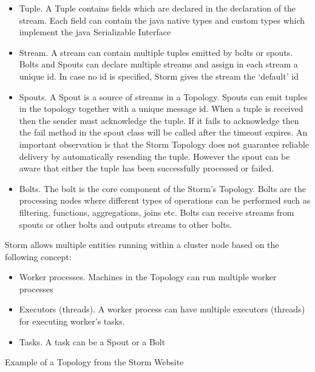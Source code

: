 \documentclass{lmproj}
\begin{document}
\begin{itemize}
	\item Tuple. A  Tuple contains fields which are declared in the declaration of the stream. Each field can contain the java native types and custom types which implement the java Serializable Interface
	\item Stream. A stream can contain multiple tuples emitted by bolts or spouts. Bolts and Spouts can declare multiple streams and assign in each stream a unique id. In case no id is specified, Storm gives the stream the ‘default’  id 
	\item Spouts. A Spout is a source of streams in a Topology. Spouts can emit tuples in the topology together with a unique message id. When a tuple is received then the sender must acknowledge the tuple. If it fails to acknowledge then the fail method in the spout class will be called after the timeout expires. An important observation is that the Storm Topology does not guarantee reliable delivery by automatically resending the tuple. However the spout can be aware that either the tuple has been successfully processed or failed.
	\item Bolts. The bolt is the core component of the Storm’s Topology. Bolts are the processing nodes where different types of operations can be performed such as filtering, functions, aggregations, joins etc. Bolts can receive streams from spouts or other bolts and outputs streams to other bolts.
\end{itemize}

Storm allows multiple entities running within a cluster node based on the following concept:

\begin{itemize}
	\item Worker processes. Machines in the Topology can run multiple worker processes 
	\item Executors (threads). A worker process can have multiple executors (threads) for executing worker’s tasks.
	\item Tasks. A task can be a Spout or a Bolt
\end{itemize}

Example of a Topology from the Storm Website
\end{document}
